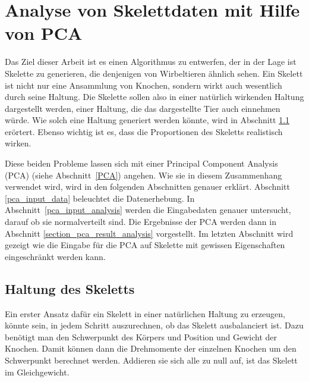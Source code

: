 \chapter{Analyse von Skelettdaten mit Hilfe von PCA}
\label{chapter:pca}

Das Ziel dieser Arbeit ist es einen Algorithmus zu entwerfen, der in der Lage ist Skelette zu generieren, die denjenigen von Wirbeltieren ähnlich sehen.
Ein Skelett ist nicht nur eine Ansammlung von Knochen, sondern wirkt auch wesentlich durch seine Haltung. Die Skelette sollen also in einer natürlich wirkenden Haltung dargestellt werden, einer Haltung, die das dargestellte Tier auch einnehmen würde.
Wie solch eine Haltung generiert werden könnte, wird in Abschnitt \ref{pose} erörtert. 
Ebenso wichtig ist es, dass die Proportionen des Skeletts realistisch wirken.

Diese beiden Probleme lassen sich mit einer Principal Component Analysis (PCA) (siehe Abschnitt~\ref{PCA}) angehen.
Wie sie in diesem Zusammenhang verwendet wird, wird in den folgenden Abschnitten genauer erklärt. Abschnitt \ref{pca_input_data} beleuchtet die Datenerhebung. In Abschnitt~\ref{pca_input_analysis} werden die Eingabedaten genauer untersucht, \zb darauf ob sie normalverteilt sind. Die Ergebnisse der PCA werden dann in Abschnitt \ref{section_pca_result_analysis} vorgestellt.
Im letzten Abschnitt wird gezeigt wie die Eingabe für die PCA auf Skelette mit gewissen Eigenschaften eingeschränkt werden kann.

\section{Haltung des Skeletts}
\label{pose}

Ein erster Ansatz dafür ein Skelett in einer natürlichen Haltung zu erzeugen, könnte sein, in jedem Schritt auszurechnen, ob das Skelett ausbalanciert ist. Dazu benötigt man den Schwerpunkt des Körpers und Position und Gewicht der Knochen.
Damit können dann die Drehmomente der einzelnen Knochen um den Schwerpunkt berechnet werden. Addieren sie sich alle zu null auf, ist das Skelett im Gleichgewicht.

